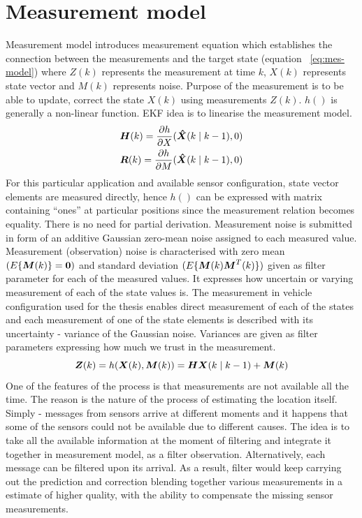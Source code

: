 \section{Measurement model} \label{sec:measurement-model}
Measurement model introduces measurement equation which establishes the connection between the measurements and the target state (equation ~\ref{eq:mes-model}) where $Z(k)$ represents the measurement at time $k$, $X(k)$ represents state vector and $M(k)$ represents noise. Purpose of the measurement is to be able to update, correct the state $X(k)$ using measurements $Z(k)$. $h()$ is generally a non-linear function. EKF idea is to linearise the measurement model.
\begin{align*}
\boldsymbol{H}(k) = \frac{\partial h}{\partial X} (\boldsymbol{\hat{X}}(k \mid k-1), 0) \\
\boldsymbol{R}(k) = \frac{\partial h}{\partial M} (\boldsymbol{\hat{X}}(k \mid k-1), 0)
\end{align*}
For this particular application and available sensor configuration, state vector elements are measured directly, hence $h()$ can be expressed with matrix containing ``ones'' at particular positions since the measurement relation becomes equality. There is no need for partial derivation. Measurement noise is submitted in form of an additive Gaussian zero-mean noise assigned to each measured value. Measurement (observation) noise is characterised with zero mean $(E \lbrace \boldsymbol{M}(k) \rbrace = \boldsymbol{0})$ and standard deviation $(E \lbrace \boldsymbol{M}(k) \boldsymbol{M}^{T}(k) \rbrace)$ given as filter parameter for each of the measured values. It expresses how uncertain or varying measurement of each of the state values is. The measurement in vehicle configuration used for the thesis enables direct measurement of each of the states and each measurement of one of the state elements is described with its uncertainty - variance of the Gaussian noise. Variances are given as filter parameters expressing how much we trust in the measurement.  
\begin{equation}
\boldsymbol{Z}(k) = h(\boldsymbol{X}(k), \boldsymbol{M}(k)) = \boldsymbol{H} \boldsymbol{X}(k \mid k-1)  + \boldsymbol{M}(k)
\label{eq:mes-model}
\end{equation}
One of the features of the process is that measurements are not available all the time. The reason is the nature of the process of estimating the location itself. Simply - messages from sensors arrive at different moments and it happens that some of the sensors could not be available due to different causes. The idea is to take all the available information at the moment of filtering and integrate it together in measurement model, as a filter observation. Alternatively, each message can be filtered upon its arrival. As a result, filter would keep carrying out the prediction and correction blending together various measurements in a estimate of higher quality, with the ability to compensate the missing sensor measurements. 

